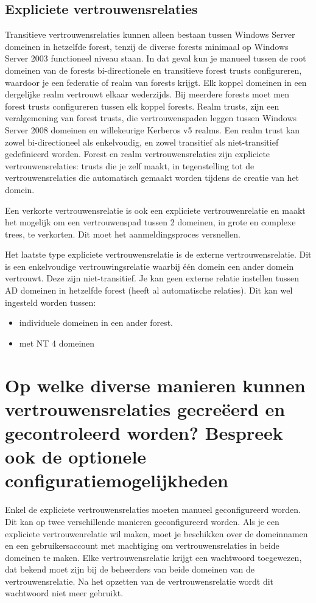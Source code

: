 \subsection{Expliciete vertrouwensrelaties}

Transitieve vertrouwensrelaties kunnen alleen bestaan tussen Windows Server
domeinen in hetzelfde forest, tenzij de diverse forests minimaal op Windows
Server 2003 functioneel niveau staan. In dat geval kun je manueel tussen de root
domeinen van de forests bi-directionele en transitieve forest trusts
configureren, waardoor je een federatie of realm van forests krijgt. Elk koppel
domeinen in een dergelijke realm vertrouwt elkaar wederzijds. Bij meerdere
forests moet men forest trusts configureren tussen elk koppel forests.
Realm trusts, zijn een veralgemening van forest trusts, die vertrouwenspaden
leggen tussen Windows Server 2008 domeinen en willekeurige Kerberos v5 realms.
Een realm trust kan zowel bi-directioneel als enkelvoudig, en zowel transitief
als niet-transitief gedefinieerd worden.
Forest en realm vertrouwensrelaties zijn expliciete vertrouwensrelaties: trusts
die je zelf maakt, in tegenstelling tot de vertrouwensrelaties die automatisch
gemaakt worden tijdens de creatie van het domein.

Een verkorte vertrouwensrelatie is ook een expliciete vertrouwenrelatie en
maakt het mogelijk om een vertrouwenspad tussen 2 domeinen, in grote en complexe
trees, te verkorten. Dit moet het aanmeldingsproces versnellen.

Het laatste type expliciete vertrouwensrelatie is de externe vertrouwensrelatie.
Dit is een enkelvoudige vertrouwingsrelatie waarbij één domein een ander domein
vertrouwt. Deze zijn niet-transitief. Je kan geen externe relatie instellen
tussen AD domeinen in hetzelfde forest (heeft al automatische relaties). Dit kan
wel ingesteld worden tussen:
\begin{itemize}
	\item individuele domeinen in een ander forest.
	\item met NT 4 domeinen
\end{itemize}

\section{Op welke diverse manieren kunnen vertrouwensrelaties gecreëerd en
gecontroleerd worden? Bespreek ook de optionele configuratiemogelijkheden}

Enkel de expliciete vertrouwensrelaties moeten manueel geconfigureerd worden.
Dit kan op twee verschillende manieren geconfigureerd worden. Als je een
expliciete vertrouwenrelatie wil maken, moet je beschikken over de domeinnamen
en een gebruikersaccount met machtiging om vertrouwensrelaties in beide domeinen
te maken. Elke vertrouwensrelatie krijgt een wachtwoord toegewezen, dat bekend
moet zijn bij de beheerders van beide domeinen van de vertrouwensrelatie. Na het
opzetten van de vertrouwensrelatie wordt dit wachtwoord niet meer gebruikt.

